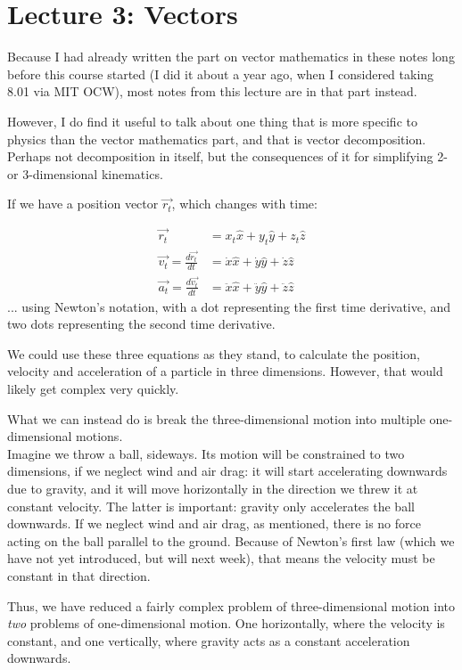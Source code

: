\documentclass[8.01x]{subfiles}
\begin{document}
\section{Lecture 3: Vectors}

Because I had already written the part on vector mathematics in these notes long before this course started (I did it about a year ago, when I considered taking 8.01 via MIT OCW), most notes from this lecture are in that part instead.

However, I do find it useful to talk about one thing that is more specific to physics than the vector mathematics part, and that is vector decomposition. Perhaps not decomposition in itself, but the consequences of it for simplifying 2- or 3-dimensional kinematics.

If we have a position vector $\vec{r_t}$, which changes with time:

\begin{align}
 \vec{r_t} &= x_t \hat{x} + y_t \hat{y} + z_t \hat{z} \\
 \vec{v_t} = \frac{d\vec{r_t}}{dt} &= \dot{x} \hat{x} + \dot{y} \hat{y} + \dot{z} \hat{z}\\
 \vec{a_t} = \frac{d\vec{v_t}}{dt} &= \ddot{x} \hat{x} + \ddot{y} \hat{y} + \ddot{z} \hat{z}
\end{align}
... using Newton's notation, with a dot representing the first time derivative, and two dots representing the second time derivative.

We could use these three equations as they stand, to calculate the position, velocity and acceleration of a particle in three dimensions. However, that would likely get complex very quickly.

What we can instead do is break the three-dimensional motion into multiple one-dimensional motions.\\
Imagine we throw a ball, sideways. Its motion will be constrained to two dimensions, if we neglect wind and air drag: it will start accelerating downwards due to gravity, and it will move horizontally in the direction we threw it at constant velocity. The latter is important: gravity only accelerates the ball downwards. If we neglect wind and air drag, as mentioned, there is no force acting on the ball parallel to the ground. Because of Newton's first law (which we have not yet introduced, but will next week), that means the velocity must be constant in that direction.

Thus, we have reduced a fairly complex problem of three-dimensional motion into \emph{two} problems of one-dimensional motion. One horizontally, where the velocity is constant, and one vertically, where gravity acts as a constant acceleration downwards.
\end{document}
